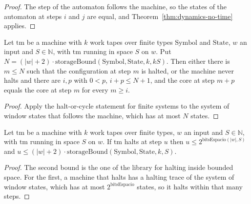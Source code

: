 \begin{proof}
  \leanok
  The step of the automaton follows the machine, so the states of the automaton at steps $i$ and
  $j$ are equal, and Theorem~\ref{thm:dynamics-no-time} applies.
\end{proof}

\begin{theorem}
  \label{thm:dynamics-halt-or-cycle-machine}
  \leanok
  Let $\mathrm{tm}$ be a machine with $k$ work tapes over finite types $\mathrm{Symbol}$ and
  $\mathrm{State}$, $w$ an input and $S \in \mathbb{N}$, with $\mathrm{tm}$ running in space $S$ on
  $w$. Put $N = (|w| + 2) \cdot \mathrm{storageBound}(\mathrm{Symbol}, \mathrm{State}, k, kS)$.
  Then either there is $m \le N$ such that the configuration at step $m$ is halted, or the machine
  never halts and there are $i, p$ with $0 < p$, $i + p \le N + 1$, and the core at step $m + p$
  equals the core at step $m$ for every $m \ge i$.
  \own{}
\end{theorem}

\begin{proof}
  \leanok
  Apply the halt-or-cycle statement for finite systems to the system of window states that follows
  the machine, which has at most $N$ states.
\end{proof}

\begin{theorem}
  \label{thm:dynamics-halt-soon-machine}
  \leanok
  Let $\mathrm{tm}$ be a machine with $k$ work tapes over finite types, $w$ an input and
  $S \in \mathbb{N}$, with $\mathrm{tm}$ running in space $S$ on $w$. If $\mathrm{tm}$ halts at
  step $u$ then $u \le 2^{\mathrm{bitsEspacio}(|w|, S)}$ and
  $u \le (|w| + 2) \cdot \mathrm{storageBound}(\mathrm{Symbol}, \mathrm{State}, k, S)$.
  \own{}
\end{theorem}

\begin{proof}
  \leanok
  The second bound is the one of the library for halting inside bounded space. For the first, a
  machine that halts has a halting trace of the system of window states, which has at most
  $2^{\mathrm{bitsEspacio}}$ states, so it halts within that many steps.
\end{proof}

